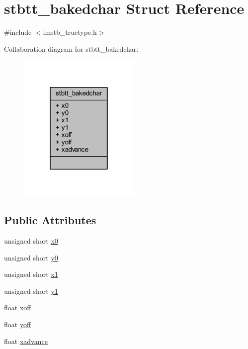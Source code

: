 \hypertarget{structstbtt__bakedchar}{}\section{stbtt\+\_\+bakedchar Struct Reference}
\label{structstbtt__bakedchar}


{\ttfamily \#include $<$imstb\+\_\+truetype.\+h$>$}



Collaboration diagram for stbtt\+\_\+bakedchar\+:
\nopagebreak
\begin{figure}[H]
\begin{center}
\leavevmode
\includegraphics[width=166pt]{structstbtt__bakedchar__coll__graph}
\end{center}
\end{figure}
\subsection*{Public Attributes}
\begin{DoxyCompactItemize}
\item 
unsigned short \mbox{\hyperlink{structstbtt__bakedchar_a8011a0ed0410de9fa405c9cb1ab43da2}{x0}}
\item 
unsigned short \mbox{\hyperlink{structstbtt__bakedchar_aec4def12c086e0038ba32ff33ee78644}{y0}}
\item 
unsigned short \mbox{\hyperlink{structstbtt__bakedchar_a72c22c32abde95a5ba02925b8bd892bf}{x1}}
\item 
unsigned short \mbox{\hyperlink{structstbtt__bakedchar_ac831dc667f6c39b5d22740c6cbd5bc3f}{y1}}
\item 
float \mbox{\hyperlink{structstbtt__bakedchar_a0708a6588a2768b68a3ae59002944b7c}{xoff}}
\item 
float \mbox{\hyperlink{structstbtt__bakedchar_aba01393e52d1c6f4ce86a8b51e498bb4}{yoff}}
\item 
float \mbox{\hyperlink{structstbtt__bakedchar_ad77b35d1a849d9eb7edb91df05b10536}{xadvance}}
\end{DoxyCompactItemize}



